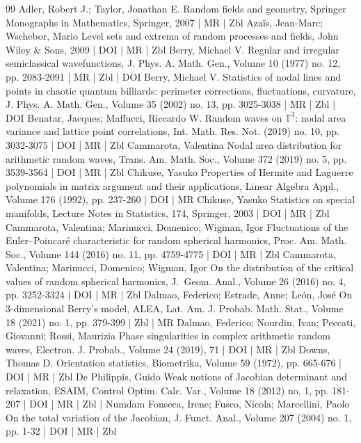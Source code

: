 \begin{thebibliography}{99}
 Adler, Robert J.; Taylor, Jonathan E. Random fields and geometry, Springer Monographs in Mathematics, Springer, 2007 | MR | Zbl
 Azaïs, Jean-Marc; Wschebor, Mario Level sets and extrema of random processes and fields, John Wiley \& Sons, 2009 | DOI | MR | Zbl
 Berry, Michael V. Regular and irregular semiclassical wavefunctions, J. Phys. A. Math. Gen., Volume 10 (1977) no. 12, pp. 2083-2091 | MR | Zbl | DOI
 Berry, Michael V. Statistics of nodal lines and points in chaotic quantum billiards: perimeter corrections, fluctuations, curvature, J. Phys. A. Math. Gen., Volume 35 (2002) no. 13, pp. 3025-3038 | MR | Zbl | DOI
 Benatar, Jacques; Maffucci, Riccardo W. Random waves on $\mathbb{T}^3$: nodal area variance and lattice point correlations, Int. Math. Res. Not. (2019) no. 10, pp. 3032-3075 | DOI | MR | Zbl
 Cammarota, Valentina Nodal area distribution for arithmetic random waves, Trans. Am. Math. Soc., Volume 372 (2019) no. 5, pp. 3539-3564 | DOI | MR | Zbl
 Chikuse, Yasuko Properties of Hermite and Laguerre polynomials in matrix argument and their applications, Linear Algebra Appl., Volume 176 (1992), pp. 237-260 | DOI | MR
 Chikuse, Yasuko Statistics on special manifolds, Lecture Notes in Statistics, 174, Springer, 2003 | DOI | MR | Zbl
 Cammarota, Valentina; Marinucci, Domenico; Wigman, Igor Fluctuations of the Euler–Poincaré characteristic for random spherical harmonics, Proc. Am. Math. Soc., Volume 144 (2016) no. 11, pp. 4759-4775 | DOI | MR | Zbl
 Cammarota, Valentina; Marinucci, Domenico; Wigman, Igor On the distribution of the critical values of random spherical harmonics, J. Geom. Anal., Volume 26 (2016) no. 4, pp. 3252-3324 | DOI | MR | Zbl
 Dalmao, Federico; Estrade, Anne; León, José On 3-dimensional Berry’s model, ALEA, Lat. Am. J. Probab. Math. Stat., Volume 18 (2021) no. 1, pp. 379-399 | Zbl | MR
 Dalmao, Federico; Nourdin, Ivan; Peccati, Giovanni; Rossi, Maurizia Phase singularities in complex arithmetic random waves, Electron. J. Probab., Volume 24 (2019), 71 | DOI | MR | Zbl
 Downs, Thomas D. Orientation statistics, Biometrika, Volume 59 (1972), pp. 665-676 | DOI | MR | Zbl
 De Philippis, Guido Weak notions of Jacobian determinant and relaxation, ESAIM, Control Optim. Calc. Var., Volume 18 (2012) no. 1, pp. 181-207 | DOI | MR | Zbl | Numdam
 Fonseca, Irene; Fusco, Nicola; Marcellini, Paolo On the total variation of the Jacobian, J. Funct. Anal., Volume 207 (2004) no. 1, pp. 1-32 | DOI | MR | Zbl

\end{thebibliography}
